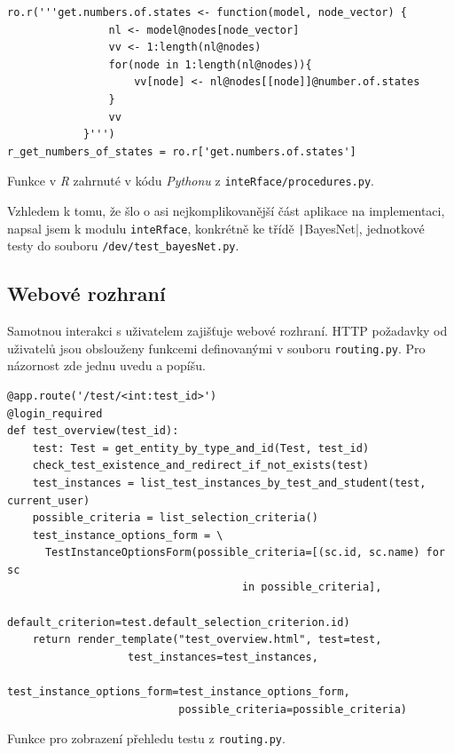 \documentclass[a4paper,twoside,12pt]{scrbook}
\begin{document}
\begin{listing}
\centering
\begin{verbatim}
ro.r('''get.numbers.of.states <- function(model, node_vector) {
                nl <- model@nodes[node_vector]
                vv <- 1:length(nl@nodes)
                for(node in 1:length(nl@nodes)){
                    vv[node] <- nl@nodes[[node]]@number.of.states
                }
                vv
            }''')
r_get_numbers_of_states = ro.r['get.numbers.of.states']
\end{verbatim}
\caption{Funkce v \textit{R} zahrnuté v kódu \textit{Pythonu} z \texttt{inteRface/procedures.py}.}
\label{lst:PyR}
\end{listing}

Vzhledem k tomu, že šlo o asi nejkomplikovanější část aplikace na implementaci, napsal jsem k modulu \texttt{inteRface}, konkrétně ke třídě \texttt|BayesNet|, jednotkové testy do souboru \texttt{/dev/test\_bayesNet.py}.

\subsection{Webové rozhraní}
Samotnou interakci s uživatelem zajišťuje webové rozhraní. HTTP požadavky od uživatelů jsou obslouženy funkcemi definovanými v souboru \texttt{routing.py}. Pro názornost zde jednu uvedu a popíšu.

\begin{listing}
\centering
\begin{verbatim}
@app.route('/test/<int:test_id>')
@login_required
def test_overview(test_id):
    test: Test = get_entity_by_type_and_id(Test, test_id)
    check_test_existence_and_redirect_if_not_exists(test)
    test_instances = list_test_instances_by_test_and_student(test, current_user)
    possible_criteria = list_selection_criteria()
    test_instance_options_form = \
      TestInstanceOptionsForm(possible_criteria=[(sc.id, sc.name) for sc
			                         in possible_criteria],
                              default_criterion=test.default_selection_criterion.id)
    return render_template("test_overview.html", test=test,
		           test_instances=test_instances,
                           test_instance_options_form=test_instance_options_form,
                           possible_criteria=possible_criteria)

\end{verbatim}
\caption{Funkce pro zobrazení přehledu testu z \texttt{routing.py}.}
\label{lst:test_view}
\end{listing}
\end{document}
